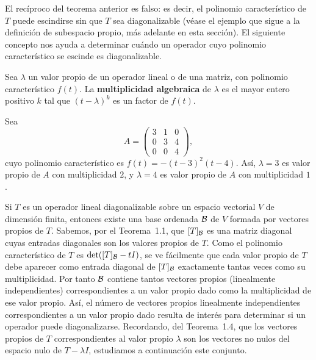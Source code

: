 \documentclass[12pt,a4paper]{book}
\begin{document}
    El recíproco del teorema anterior es falso: es decir, el polinomio característico de $T$ puede escindirse sin que $T$ sea diagonalizable (véase el ejemplo que sigue a la definición de subespacio propio, más adelante en esta sección). El siguiente concepto nos ayuda a determinar cuándo un operador cuyo polinomio característico se escinde es diagonalizable.

    \begin{definicion}
        Sea $\lambda$ un valor propio de un operador lineal o de una matriz, con polinomio característico $f(t)$. La \textbf{multiplicidad algebraica} de $\lambda$ es el mayor entero positivo $k$ tal que $(t-\lambda)^k$ es un factor de $f(t)$.
    \end{definicion}

    \begin{ejemplo}
        Sea
        \begin{equation*}
            A=\begin{pmatrix}3&1&0\\0&3&4\\0&0&4\end{pmatrix},
        \end{equation*}
        cuyo polinomio característico es $f(t)=-(t-3)^2(t-4)$. Así, $\lambda=3$ es valor propio de $A$ con multiplicidad $2$, y $\lambda=4$ es valor propio de $A$ con multiplicidad $1$.
    \end{ejemplo}

    Si $T$ es un operador lineal diagonalizable sobre un espacio vectorial $V$ de dimensión finita, entonces existe una base ordenada $\mathcal{B}$ de $V$ formada por vectores propios de $T$. Sabemos, por el Teorema~1.1, que $[T]_{\mathcal{B}}$ es una matriz diagonal cuyas entradas diagonales son los valores propios de $T$. Como el polinomio característico de $T$ es $\det([T]_{\mathcal{B}}-tI)$, se ve fácilmente que cada valor propio de $T$ debe aparecer como entrada diagonal de $[T]_{\mathcal{B}}$ exactamente tantas veces como su multiplicidad. Por tanto $\mathcal{B}$ contiene tantos vectores propios (linealmente independientes) correspondientes a un valor propio dado como la multiplicidad de ese valor propio. Así, el número de vectores propios linealmente independientes correspondientes a un valor propio dado resulta de interés para determinar si un operador puede diagonalizarse. Recordando, del Teorema~1.4, que los vectores propios de $T$ correspondientes al valor propio $\lambda$ son los vectores no nulos del espacio nulo de $T-\lambda I$, estudiamos a continuación este conjunto.
\end{document}
